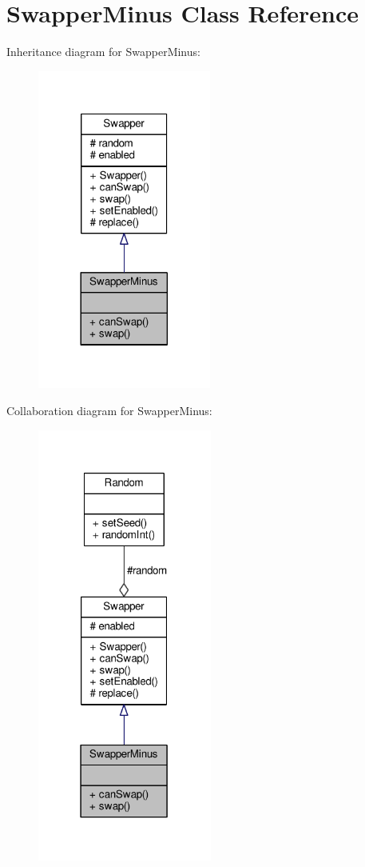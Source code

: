 \hypertarget{classSwapperMinus}{}\section{Swapper\+Minus Class Reference}
\label{classSwapperMinus}


Inheritance diagram for Swapper\+Minus\+:
\nopagebreak
\begin{figure}[H]
\begin{center}
\leavevmode
\includegraphics[width=161pt]{classSwapperMinus__inherit__graph}
\end{center}
\end{figure}


Collaboration diagram for Swapper\+Minus\+:
\nopagebreak
\begin{figure}[H]
\begin{center}
\leavevmode
\includegraphics[width=162pt]{classSwapperMinus__coll__graph}
\end{center}
\end{figure}
